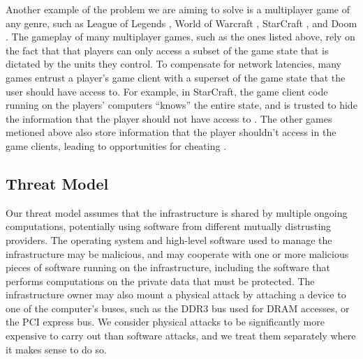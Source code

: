 Another example of the problem we are aiming to solve is a multiplayer game of
any genre, such as League of Legends \cite{riot2009lol},
World of Warcraft \cite{blizzard2004wow}, StarCraft \cite{blizzard2010sc2}, and
Doom \cite{id2004doom}. The gameplay of many multiplayer games, such as the
ones listed above, rely on the fact that that players can only access a subset
of the game state that is dictated by the units they control. To compensate for
network latencies, many games entrust a player's game client with a superset
of the game state that the user should have access to. For example, in
StarCraft, the game client code running on the players' computers ``knows'' the
entire state, and is trusted to hide the information that the player should not
have access to \cite{hardy2009cheating}. The other games metioned above also
store information that the player shouldn't access in the game clients, leading
to opportunities for cheating \cite{youtube2013lolcheating}
\cite{youtube2008quake3cheating}.


\subsection{Threat Model}
\label{sec:threat}

Our threat model assumes that the infrastructure is shared by multiple ongoing
computations, potentially using software from different mutually distrusting
providers. The operating system and high-level software used to manage the
infrastructure may be malicious, and may cooperate with one or more malicious
pieces of software running on the infrastructure, including the software that
performs computations on the private data that must be protected. The
infrastructure owner may also mount a physical attack by attaching a device to
one of the computer's buses, such as the DDR3 bus used for DRAM accesses, or
the PCI express bus. We consider physical attacks to be significantly more
expensive to carry out than software attacks, and we treat them separately
where it makes sense to do so.

